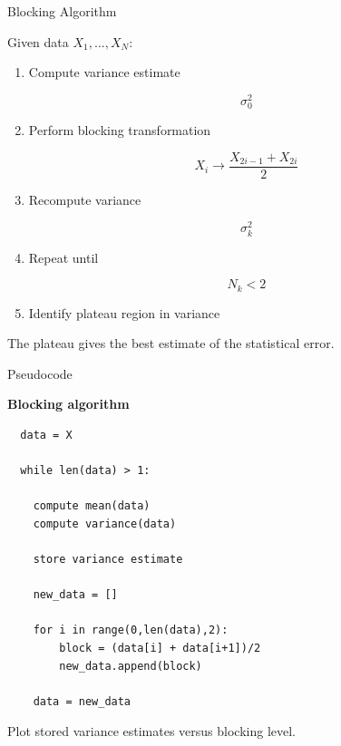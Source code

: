 \documentclass{beamer}
\begin{document}

\begin{frame}{Blocking Algorithm}

  Given data $X_1,\dots,X_N$:

  \begin{enumerate}

  \item Compute variance estimate

    \[
    \sigma_0^2
    \]

  \item Perform blocking transformation

    \[
    X_i \rightarrow \frac{X_{2i-1}+X_{2i}}{2}
    \]

  \item Recompute variance

    \[
    \sigma_k^2
    \]

  \item Repeat until

    \[
    N_k < 2
    \]

  \item Identify plateau region in variance

  \end{enumerate}

  The plateau gives the best estimate of the statistical error.
\end{frame}


\begin{frame}{Pseudocode}

  \textbf{Blocking algorithm}

\begin{verbatim}
  data = X

  while len(data) > 1:

    compute mean(data)
    compute variance(data)

    store variance estimate

    new_data = []

    for i in range(0,len(data),2):
        block = (data[i] + data[i+1])/2
        new_data.append(block)

    data = new_data
\end{verbatim}

Plot stored variance estimates versus blocking level.
\end{frame}

\end{document}
